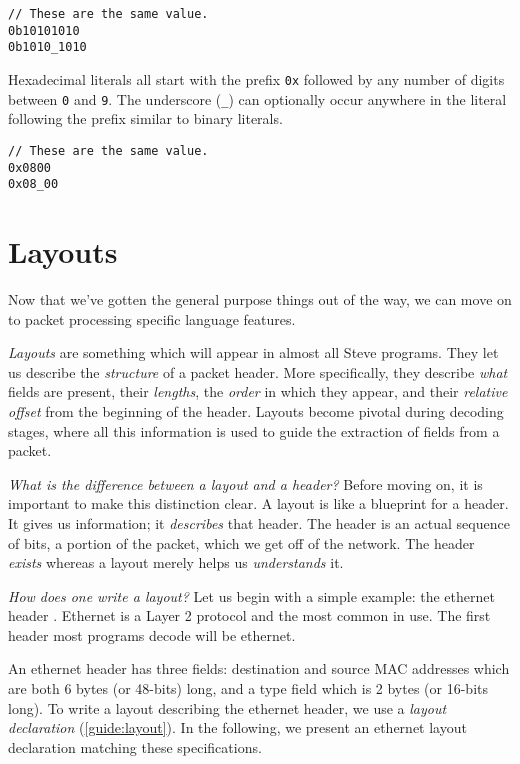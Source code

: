 \begin{codepage}
\begin{lstlisting}
// These are the same value.
0b10101010
0b1010_1010
\end{lstlisting}
\end{codepage}

Hexadecimal literals all start with the prefix \texttt{0x} followed by any number of digits between \texttt{0} and \texttt{9}. The underscore (\texttt{\_}) can optionally occur anywhere in the literal following the prefix similar to binary literals.

\begin{codepage}
\begin{lstlisting}
// These are the same value.
0x0800
0x08_00
\end{lstlisting}
\end{codepage}

\section{Layouts} \label{tut:layout}

Now that we've gotten the general purpose things out of the way, we can move on to packet processing specific language features.

\textit{Layouts} are something which will appear in almost all Steve programs. They let us describe the \textit{structure} of a packet header. More specifically, they describe \textit{what} fields are present, their \textit{lengths}, the \textit{order} in which they appear, and their \textit{relative offset} from the beginning of the header. Layouts become pivotal during decoding stages, where all this information is used to guide the extraction of fields from a packet. 

\textit{What is the difference between a layout and a header?} Before moving on, it is important to make this distinction clear. A layout is like a blueprint for a header. It gives us information; it \textit{describes} that header. The header is an actual sequence of bits, a portion of the packet, which we get off of the network. The header \textit{exists} whereas a layout merely helps us \textit{understands} it. 

\textit{How does one write a layout?} Let us begin with a simple example: the ethernet header \cite{eth_std}. Ethernet is a Layer 2 \cite{osi_model} protocol and the most common in use. The first header most programs decode will be ethernet.

An ethernet header has three fields: destination and source MAC addresses which are both 6 bytes (or 48-bits) long, and a type field which is 2 bytes (or 16-bits long). To write a layout describing the ethernet header, we use a \textit{layout declaration} (\ref{guide:layout}). In the following, we present an ethernet layout declaration matching these specifications.

